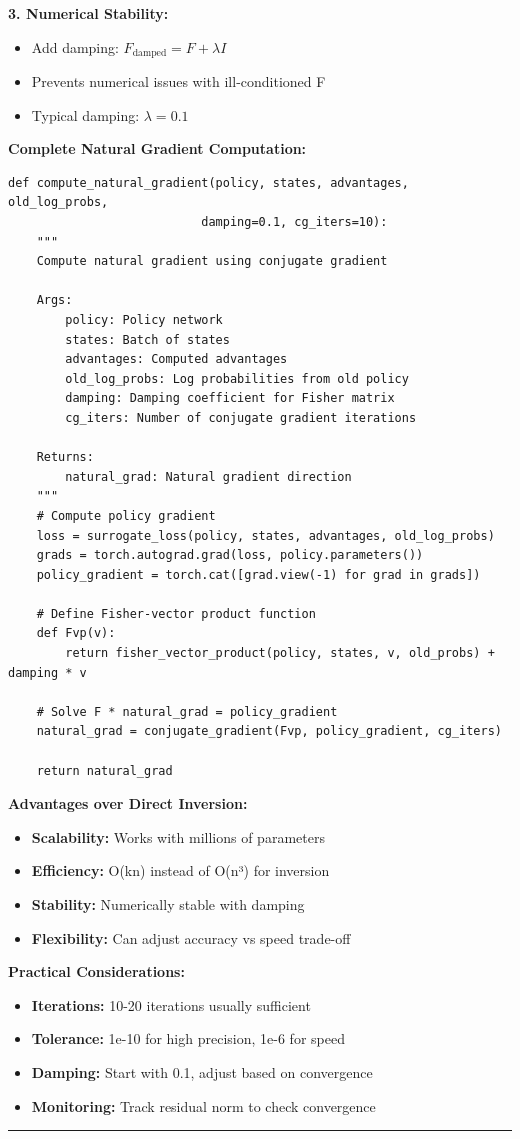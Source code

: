 \documentclass[12pt]{article}
\begin{document}
{{\textbf{3. Numerical Stability:}
\begin{itemize}
\item Add damping: $F_{\text{damped}} = F + \lambda I$
\item Prevents numerical issues with ill-conditioned F
\item Typical damping: $\lambda = 0.1$
\end{itemize}

\textbf{Complete Natural Gradient Computation:}

\begin{verbatim}
def compute_natural_gradient(policy, states, advantages, old_log_probs, 
                           damping=0.1, cg_iters=10):
    """
    Compute natural gradient using conjugate gradient
    
    Args:
        policy: Policy network
        states: Batch of states
        advantages: Computed advantages
        old_log_probs: Log probabilities from old policy
        damping: Damping coefficient for Fisher matrix
        cg_iters: Number of conjugate gradient iterations
    
    Returns:
        natural_grad: Natural gradient direction
    """
    # Compute policy gradient
    loss = surrogate_loss(policy, states, advantages, old_log_probs)
    grads = torch.autograd.grad(loss, policy.parameters())
    policy_gradient = torch.cat([grad.view(-1) for grad in grads])
    
    # Define Fisher-vector product function
    def Fvp(v):
        return fisher_vector_product(policy, states, v, old_probs) + damping * v
    
    # Solve F * natural_grad = policy_gradient
    natural_grad = conjugate_gradient(Fvp, policy_gradient, cg_iters)
    
    return natural_grad
\end{verbatim}

\textbf{Advantages over Direct Inversion:}

\begin{itemize}
\item \textbf{Scalability:} Works with millions of parameters
\item \textbf{Efficiency:} O(kn) instead of O(n³) for inversion
\item \textbf{Stability:} Numerically stable with damping
\item \textbf{Flexibility:} Can adjust accuracy vs speed trade-off
\end{itemize}

\textbf{Practical Considerations:}

\begin{itemize}
\item \textbf{Iterations:} 10-20 iterations usually sufficient
\item \textbf{Tolerance:} 1e-10 for high precision, 1e-6 for speed
\item \textbf{Damping:} Start with 0.1, adjust based on convergence
\item \textbf{Monitoring:} Track residual norm to check convergence
\end{itemize}

\noindent\rule{\textwidth}{0.2pt}
}}
\end{document}
